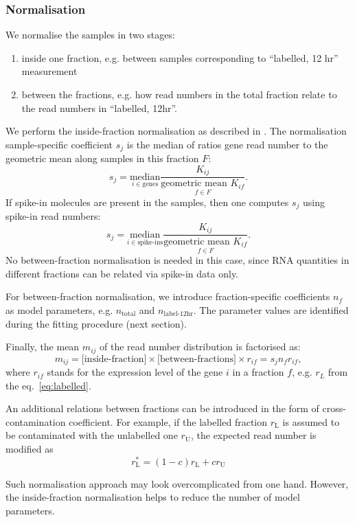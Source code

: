 \subsubsection{Normalisation}
We normalise the samples in two stages:
\begin{enumerate}
\item inside one fraction,
e.g. between samples corresponding to ``labelled, 12 hr'' measurement
\item between the fractions, 
e.g. how read numbers in the total fraction relate to the read numbers in 
``labelled, 12hr''.
\end{enumerate}
We perform the inside-fraction  normalisation as described in 
\citep{anders2010differential}. The normalisation sample-specific 
coefficient $s_j$ is the median of ratios gene read number to the geometric mean
along samples in this fraction $F$:
\begin{equation}
 s_j = \underset{i\in \text{genes}}{\mathrm{median}}
 \frac{K_{ij}}{\underset{f \in F}{\text{geometric mean }K_{if}}}.
\end{equation}
If spike-in molecules are present in the samples, then one computes $s_{j}$ 
using spike-in read numbers: 
\begin{equation}
 s_j = \underset{i \in \text{spike-ins}}{\mathrm{median}}
 \frac{K_{ij}}{\underset{f \in F}{\text{geometric mean }K_{if}}}.
\end{equation}
No between-fraction normalisation is needed in this case, since RNA quantities
in different fractions can be related via spike-in data only.
\par
For between-fraction normalisation, we introduce fraction-specific 
coefficients $n_f$ as model parameters, 
e.g. $n_\text{total}$ and $n_\text{label-12hr}$. The parameter values are identified
during the fitting procedure (next section).
\par
Finally, the mean $m_{ij}$ of the read number distribution is factorised as:
\begin{equation}
 m_{ij} = \text{[inside-fraction]}\times\text{[between-fractions]}\times
 r_{if} = s_jn_fr_{if},
 \end{equation}
where $r_{if}$ stands for the expression level of the gene $i$ in a fraction $f$, e.g.
$r_L$ from the eq.~\ref{eq:labelled}. 
\par
An additional relations between fractions can be introduced in the form 
of cross-contamination coefficient. For example,
if the labelled fraction $r_\text{L}$ is assumed to be 
contaminated with the unlabelled one $r_\text{U}$,
the expected read number is modified as
\begin{equation}
  r^*_\text{L} = (1-c)r_\text{L} + cr_\text{U}
 \end{equation}
\par  Such normalisation approach may look overcomplicated 
from one hand. However, the inside-fraction normalisation helps to reduce the number
of model parameters. 
